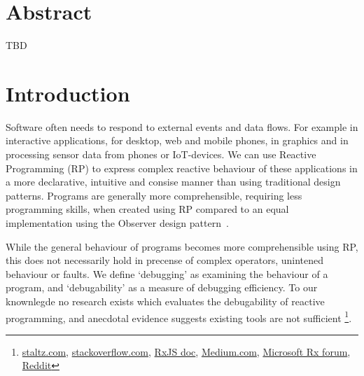 \section{Abstract} TBD




\section{Introduction}%
\label{sec:intro} Software often needs to respond to external events and
data flows.  For example in interactive applications, for desktop, web
and mobile phones, in graphics and in processing sensor data from phones
or IoT-devices.  We can use Reactive Programming (RP) to express complex
reactive behaviour of these applications in a more declarative,
intuitive and consise manner than using traditional design patterns.
Programs are generally more comprehensible, requiring less programming
skills, when created using RP compared to an equal implementation using
the Observer design pattern~\cite{johnson1995design,
salvaneschi2014empirical}.

While the general behaviour of programs becomes more comprehensible
using RP, this does not necessarily hold in precense of complex
operators, unintened behaviour or faults.  We define `debugging' as
examining the behaviour of a program, and `debugability' as a measure of
debugging efficiency.  To our knownlegde no research exists which
evaluates the debugability of reactive programming, and anecdotal
evidence suggests existing tools are not sufficient%
\footnote{
\href{http://staltz.com/how-to-debug-rxjs-code.html}{staltz.com},
\href{http://stackoverflow.com/questions/38590346/how-to-debug-rxjs5}{stackoverflow.com},
\href{https://github.com/Reactive-Extensions/RxJS/blob/master/doc/gettingstarted/testing.md\#debugging-your-rx-application}{RxJS doc},
\href{https://medium.com/@BrianDiPalma/thoughts-on-rxjs-cf3562e20d74\#.ebdrmmeym}{Medium.com},
\href{https://social.msdn.microsoft.com/Forums/en-US/a0215434-8ad6-45e1-9f21-ed2f14d7317a/a-simple-trace-method\?forum=rx}{Microsoft Rx forum},
\href{https://www.reddit.com/r/javascript/comments/4austh/why_isnt_rxjs_more_popular_are_there_bad_parts}{Reddit}
}.

